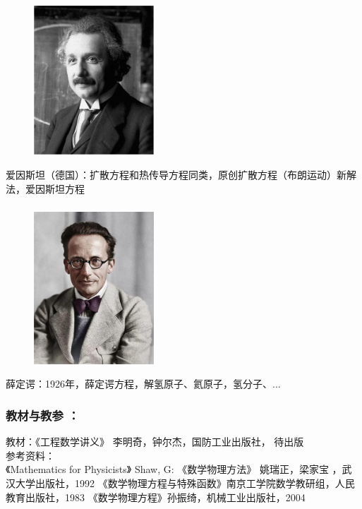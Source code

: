 \begin{frame}
	\frametitle{}
	\begin{center}
		\begin{figure}
			\includegraphics[width=4.5cm]{figs/fig1-3-8.png}	
		\end{figure}
	\end{center}
	{爱因斯坦（德国）：扩散方程和热传导方程同类，原创扩散方程（布朗运动）新解法，爱因斯坦方程}
\end{frame}

\begin{frame}
	\frametitle{}
	\begin{center}
		\begin{figure}
			\includegraphics[width=4.5cm]{figs/fig1-3-9.png}	
		\end{figure}
	\end{center}
	{薛定谔：1926年，薛定谔方程，解氢原子、氦原子，氢分子、... }
\end{frame}
\begin{frame}
	\frametitle{教材与教参 ：}
	\begin{enumerate}
		\IItem 教材：《工程数学讲义》 李明奇，钟尔杰，国防工业出版社， 待出版\\	\vspace{0.3cm}
     	参考资料：\\
		\IItem 《Mathematics for Physicists》 Shaw, G:
		\vspace{0.3cm}
		\IItem 《数学物理方法》 姚瑞正，梁家宝 ，武汉大学出版社，1992 
		\vspace{0.3cm}
		\IItem 《数学物理方程与特殊函数》南京工学院数学教研组，人民教育出版社，1983
		\vspace{0.3cm}
		\IItem 《数学物理方程》孙振绮，机械工业出版社，2004
	\end{enumerate}	
\end{frame}

